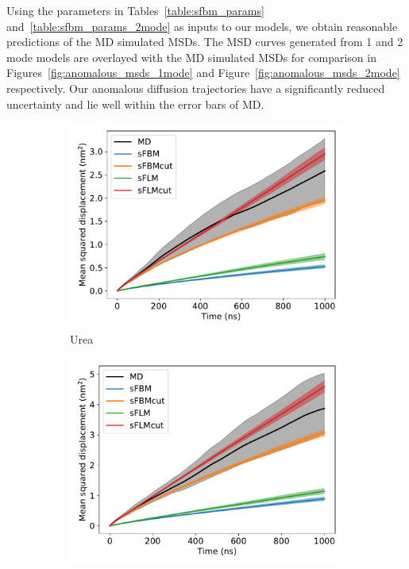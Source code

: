 \documentclass{article}
\begin{document}
  Using the parameters in Tables~\ref{table:sfbm_params} and~\ref{table:sfbm_params_2mode}
  as inputs to our models, we obtain reasonable predictions of the MD simulated MSDs. The 
  MSD curves generated from 1 and 2 mode models are overlayed with the MD simulated MSDs for 
  comparison in Figures~\ref{fig:anomalous_msds_1mode} and Figure~\ref{fig:anomalous_msds_2mode}
  respectively. Our anomalous diffusion trajectories have a significantly reduced 
  uncertainty and lie well within the error bars of MD.
  
  \begin{figure}
  \centering
  \begin{subfigure}{0.45\textwidth}
  \includegraphics[width=\textwidth]{1mode_msd_comparison_URE.pdf}
  \caption{Urea}\label{fig:1mode_msd_comparison_URE}
  \end{subfigure}
  \begin{subfigure}{0.45\textwidth}
  \includegraphics[width=\textwidth]{1mode_msd_comparison_GCL.pdf}

\end{subfigure}
\end{figure}
\end{document}
